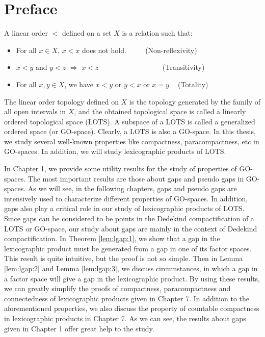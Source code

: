 \documentclass[12pt,oneside,english]{amsbook}
\numberwithin{equation}{section} %
\numberwithin{figure}{section} %
\theoremstyle{plain}
\numberwithin{section}{chapter}
\theoremstyle{plain}
\begin{document}
\newpage
\setcounter{page}{1}
\tableofcontents{}


\chapter*{Preface}
  A linear order $<$ defined on a set $X$ is a relation such that:
  \begin{itemize}
  \item For all $x \in X$, $x < x$ does not hold.  $\qquad \! \!$ (Non-reflexivity)
  \item $x < y$ and $y < z$ $\Rightarrow$ $x < z$ $\qquad \qquad \qquad \qquad \;$ (Transitivity)
  \item For all $x, y \in X$, we have $x <y$ or $y <x$ or $x = y$ $  \;  \;$ (Totality) 
  \end{itemize}
  The linear order topology defined on $X$ is the topology generated by the family of all open intervals in $X$, and the obtained topological space is called a linearly ordered topological space (LOTS). A subspace of a LOTS is called a generalized ordered space (or GO-space). Clearly, a LOTS is also a GO-space. In this thesis, we study several well-known properties like compactness, paracompactness, etc in GO-spaces. In addition, we will study lexicographic products of LOTS.
  
  In Chapter 1, we provide some utility results for the study of properties of GO-spaces. The most important results are those about gaps and pseudo gaps in GO-spaces. As we will see, in the following chapters, gaps and pseudo gaps are intensively used to characterize different properties of GO-spaces. In addition, gaps also play a critical role in our study of lexicographic products of LOTS. Since gaps can be considered to be points in the Dedekind compactification of a LOTS or GO-space, our study about gaps are mainly in the context of Dedekind compactification. In Theorem \ref{lem:lgap:1}, we show that a gap in the lexicographic product must be generated from a gap in one of its factor spaces. This result is quite intuitive, but the proof is not so simple. Then in Lemma \ref{lem:lgap:2} and Lemma \ref{lem:lgap:3}, we discuss circumstances, in which a gap in a factor space will give a gap in the lexicographic product. By using these results, we can greatly simplify the proofs of compactness, paracompactness and connectedness of lexicographic products given in Chapter 7. In addition to the aforementioned properties, we also discuss the property of countable compactness in lexicographic products in Chapter 7. As we can see, the results about gaps given in Chapter 1 offer great help to the study. 
\end{document}
